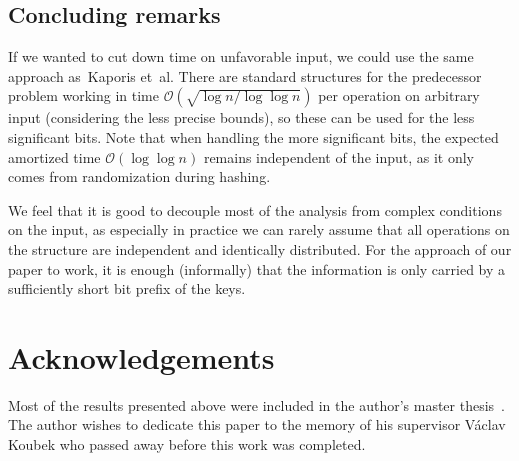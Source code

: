 \documentclass[
submission
]{dmtcs-episciences}
\theoremstyle{plain}
\theoremstyle{definition}
\theoremstyle{remark}
\theoremstyle{plain}
\theoremstyle{plain}
\def\OO{\mathcal O}
\begin{document}
\subsection{Concluding remarks}

If we wanted to cut down time on unfavorable input, we could use the
same approach as~Kaporis et~al. There are standard structures for
the predecessor problem working in time $\OO(\!\sqrt{\log n/\log\log n})$
per operation on arbitrary input (considering the less precise bounds),
so these can be used for the less significant bits. Note that when
handling the more significant bits, the expected amortized time $\OO\left(\log\log n\right)$
remains independent of the input, as it only comes from randomization
during hashing.

We feel that it is good to decouple most of the analysis from complex
conditions on the input, as especially in practice we can rarely assume
that all operations on the structure are independent and identically
distributed. For the approach of our paper to work, it is enough (informally)
that the information is only carried by a sufficiently short bit prefix
of the keys.

\section*{Acknowledgements}

Most of the results presented above were included in the author's master thesis~\cite{Cunat10}. The author wishes to dedicate this paper to the memory of his supervisor V\'aclav Koubek who passed away before this work was completed.



\end{document}
